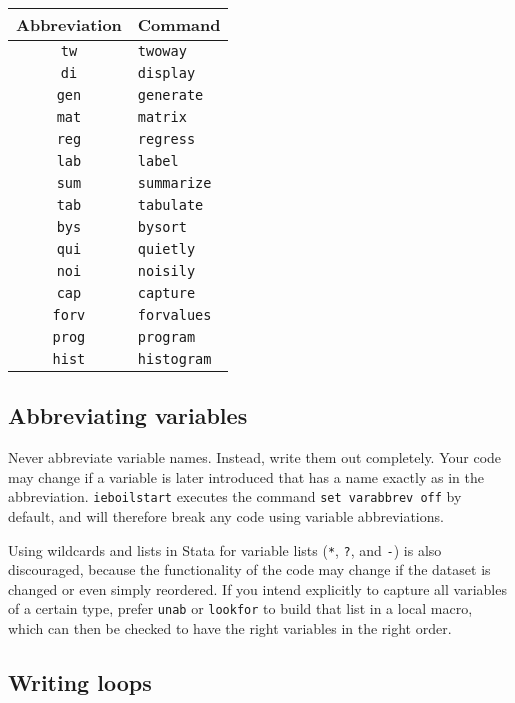 \begin{center}
	\begin{tabular}{ c | l }
    Abbreviation & Command \\
		\hline
		\texttt{tw} & \texttt{twoway} \\
		\texttt{di} & \texttt{display} \\
		\texttt{gen} & \texttt{generate} \\
		\texttt{mat} & \texttt{matrix} \\
		\texttt{reg} & \texttt{regress} \\
		\texttt{lab} & \texttt{label} \\
		\texttt{sum} & \texttt{summarize} \\
		\texttt{tab} & \texttt{tabulate} \\
		\texttt{bys} & \texttt{bysort} \\
		\texttt{qui} & \texttt{quietly} \\
		\texttt{noi} & \texttt{noisily} \\
		\texttt{cap} & \texttt{capture} \\
		\texttt{forv} & \texttt{forvalues} \\
		\texttt{prog} & \texttt{program} \\
		\texttt{hist} & \texttt{histogram} \\
		\hline
	\end{tabular}
\end{center}

\subsection{Abbreviating variables}

Never abbreviate variable names. Instead, write them out completely.
Your code may change if a variable is later introduced
that has a name exactly as in the abbreviation.
\texttt{ieboilstart} executes the command \texttt{set varabbrev off} by default,
and will therefore break any code using variable abbreviations.

Using wildcards and lists in Stata for variable lists
(\texttt{*}, \texttt{?}, and \texttt{-}) is also discouraged,
because the functionality of the code may change
if the dataset is changed or even simply reordered.
If you intend explicitly to capture all variables of a certain type,
prefer \texttt{unab} or \texttt{lookfor} to build that list in a local macro,
which can then be checked to have the right variables in the right order.

\subsection{Writing loops}

